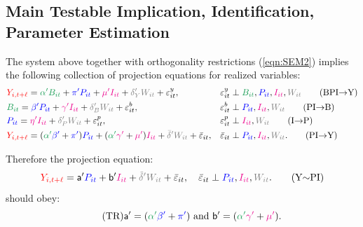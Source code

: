\documentclass[11pt,reqno,letter]{amsart}
\theoremstyle{definition}
\renewcommand{\to}{{\rightarrow}}
\def\bcolor{\color{ForestGreen}}
\def\pcolor{\color{blue}}
\def\icolor{\color{magenta}}
\def\wcolor{\color{gray}}
\def\ycolor{\color{red}}
\begin{document}



\subsection{Main Testable Implication, Identification, Parameter Estimation}

The system above together with  orthogonality restrictions (\ref{eqn:SEM2}) implies the following collection of projection equations for realized variables:
\begin{align}
   &  {\ycolor  Y_{i,t+\ell}}
    = {\bcolor\alpha ' B_{it}} + {\pcolor\pi 'P_{it}} + {\icolor\mu'I_{it}} + {\wcolor\delta_Y 'W_{it}}  + \varepsilon^y_{it},
    &  & \varepsilon^y_{it} \perp {\bcolor B_{it}}, {\pcolor P_{it}}, {\icolor I_{it}}, {\wcolor W_{it}} \label{eq:R1} \tag{BPI$\to$Y} \\
    &  {\bcolor B_{it}}
     =  {\pcolor \beta' P_{it}} + {\icolor \gamma'I_{it}} +  {\wcolor \delta_B' W_{it}} + \varepsilon^b_{it},
   & & \varepsilon^b_{it} \perp {\pcolor P_{it}}, {\icolor I_{it}}, {\wcolor W_{it}}  \label{eq:R2} \tag{PI$\to$B}  \\
    & {\pcolor P_{it}}
    =  {\icolor\eta'I_{it}} + {\wcolor \delta_P' W_{it}} +   \varepsilon^p_{it},   & & \varepsilon^p_{it} \perp   {\icolor I_{it}}, {\wcolor W_{it}}  \label{eq:R3}  \tag{I$\to$P} \\
    &  {\ycolor  Y_{i,t+\ell}}
   =     ( {\bcolor\alpha '}  {\pcolor \beta' }+{\pcolor\pi'} )   {\pcolor P_{it}} +    ( {\bcolor\alpha '}  {\icolor \gamma'} + {\icolor \mu'}){\icolor I_{it} }+ {\wcolor \bar{\delta} '}{\wcolor W_{it}}  + {\bar \varepsilon}_{it},  &&  {\bar \varepsilon}_{it} \perp
  {\pcolor P_{it}},  {\icolor I_{it}}, {\wcolor W_{it}}.  \label{eq:R4} \tag{PI$\to$Y}
      \end{align}

Therefore the projection equation:
\begin{equation}
   {\ycolor  Y_{i,t+\ell}}
   = \mathsf{a}'
    {\pcolor P_{it}} + \mathsf{b}'    {\icolor I_{it} }+ {\wcolor \tilde {\delta} '}{\wcolor W_{it}}  + {\bar \varepsilon}_{it},  \quad   {\bar \varepsilon}_{it} \perp
  {\pcolor P_{it}},  {\icolor I_{it}}, {\wcolor W_{it}}.  \label{eq:PR} \tag{Y$\sim$PI}
\end{equation}
should obey:
\begin{equation}\label{eq:TI} \tag{TR}
 \mathsf{a}'  = ( {\bcolor\alpha '}  {\pcolor \beta' }+{\pcolor\pi'} ) \text{ and }
\mathsf{b}'  = ( {\bcolor\alpha '}  {\icolor \gamma'} + {\icolor \mu'}).
\end{equation}
\end{document}
